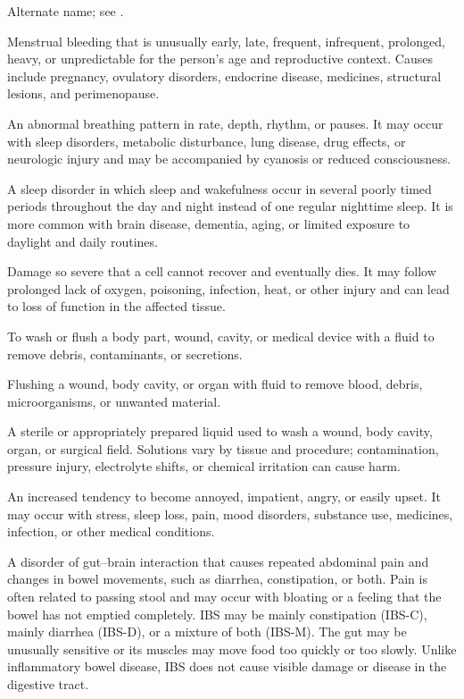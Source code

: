  Alternate name; see .

 Menstrual bleeding that is unusually early, late, frequent, infrequent, prolonged, heavy, or unpredictable for the person’s age and reproductive context. Causes include pregnancy, ovulatory disorders, endocrine disease, medicines, structural lesions, and perimenopause.

 An abnormal breathing pattern in rate, depth, rhythm, or pauses. It may occur with sleep disorders, metabolic disturbance, lung disease, drug effects, or neurologic injury and may be accompanied by cyanosis or reduced consciousness.

 A sleep disorder in which sleep and wakefulness occur in several poorly timed periods throughout the day and night instead of one regular nighttime sleep. It is more common with brain disease, dementia, aging, or limited exposure to daylight and daily routines.

 Damage so severe that a cell cannot recover and eventually dies. It may follow prolonged lack of oxygen, poisoning, infection, heat, or other injury and can lead to loss of function in the affected tissue.

 To wash or flush a body part, wound, cavity, or medical device with a fluid to remove debris, contaminants, or secretions.

 Flushing a wound, body cavity, or organ with fluid to remove blood, debris, microorganisms, or unwanted material.

 A sterile or appropriately prepared liquid used to wash a wound, body cavity, organ, or surgical field. Solutions vary by tissue and procedure; contamination, pressure injury, electrolyte shifts, or chemical irritation can cause harm.

 An increased tendency to become annoyed, impatient, angry, or easily upset. It may occur with stress, sleep loss, pain, mood disorders, substance use, medicines, infection, or other medical conditions.

 A disorder of gut--brain interaction that causes repeated abdominal pain and changes in bowel movements, such as diarrhea, constipation, or both. Pain is often related to passing stool and may occur with bloating or a feeling that the bowel has not emptied completely. IBS may be mainly constipation (IBS-C), mainly diarrhea (IBS-D), or a mixture of both (IBS-M). The gut may be unusually sensitive or its muscles may move food too quickly or too slowly. Unlike inflammatory bowel disease, IBS does not cause visible damage or disease in the digestive tract.

